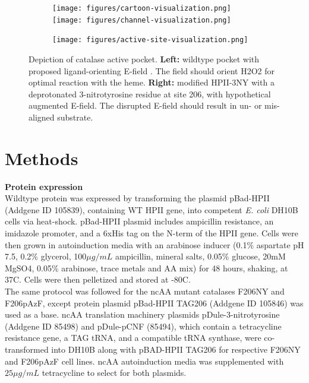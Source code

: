 \documentclass[journal=jacsat,manuscript=article]{achemso}
\begin{document}
\begin{figure}
  \begin{subfigure}{0.69\textwidth}
    \begin{minipage}{0.1\textwidth}\caption{}\end{minipage}%
    \begin{minipage}{.9\textwidth}
      \texttt{[image: figures/cartoon-visualization.png]}%
      \texttt{[image: figures/channel-visualization.png]}
    \end{minipage}
  \end{subfigure}
  \begin{subfigure}{0.3\textwidth}
    \begin{minipage}{0.1\textwidth}\caption{}\end{minipage}%
    \begin{minipage}{.9\textwidth}
      \texttt{[image: figures/active-site-visualization.png]}%
    \end{minipage}
  \end{subfigure}
  
  \caption{Depiction of catalase active pocket. \textbf{Left:} wildtype pocket with proposed ligand-orienting E-field \cite{electricpotential}. The field should orient H2O2 for optimal reaction with the heme. \textbf{Right:} modified HPII-3NY with a deprotonated 3-nitrotyrosine residue at site 206, with hypothetical augmented E-field. The disrupted E-field should result in un- or mis-aligned substrate.}
  \label{fig:hypothesis}
\end{figure}

\section{Methods}
\textbf{Protein expression}\\
Wildtype protein was expressed by transforming the plasmid pBad-HPII (Addgene ID 105839), containing WT HPII gene, into competent \textit{E. coli} DH10B cells via heat-shock. pBad-HPII plasmid includes ampicillin resistance, an imidazole promoter, and a 6xHis tag on the N-term of the HPII gene. Cells were then grown in autoinduction media with an arabinose inducer (0.1\% aspartate pH 7.5, 0.2\% glycerol, 100$\mu g / mL$ ampicillin, mineral salts, 0.05\% glucose, 20mM MgSO4, 0.05\% arabinose, trace metals and AA mix) for 48 hours, shaking, at 37C. Cells were then pelletized and stored at -80C.\\

The same protocol was followed for the ncAA mutant catalases F206NY and F206pAzF, except protein plasmid pBad-HPII TAG206 (Addgene ID 105846) was used as a base. ncAA translation machinery plasmids pDule-3-nitrotyrosine (Addgene ID 85498) and pDule-pCNF (85494), which contain a tetracycline resistance gene, a TAG tRNA, and a compatible tRNA synthase, were co-transformed into DH10B along with pBAD-HPII TAG206 for respective F206NY and F206pAzF cell lines. ncAA autoinduction media was supplemented with $25\mu g / mL$ tetracycline to select for both plasmids.\\
\end{document}
